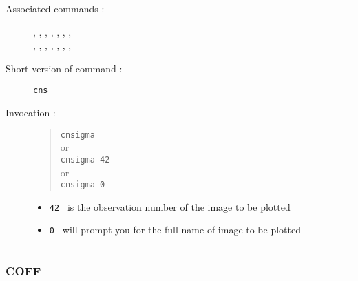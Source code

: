 \begin{description}
\item[Associated commands :] {\tt {}},
{\tt {}}, {\tt {}},
{\tt {}}, {\tt {}},
{\tt {}}, {\tt {}}, \\
{\tt {}}, {\tt {}},
{\tt {}}, {\tt {}},
{\tt {}}, {\tt {}},
{\tt {}}, {\tt {}}

\item[Short version of command :] {\tt cns}
\item[Invocation :]

\begin{quote}{\tt  cnsigma }\\
or \\
{\tt cnsigma 42 }\\
or \\
{\tt  cnsigma 0 }
\end{quote}

\begin{itemize}
\item {\tt 42 } is the observation number of the image to be plotted
\item {\tt 0 } will prompt you for the full name of image to be plotted
\end{itemize}

\end{description}

\hrule
\subsubsection*{\label{COFF}COFF}

